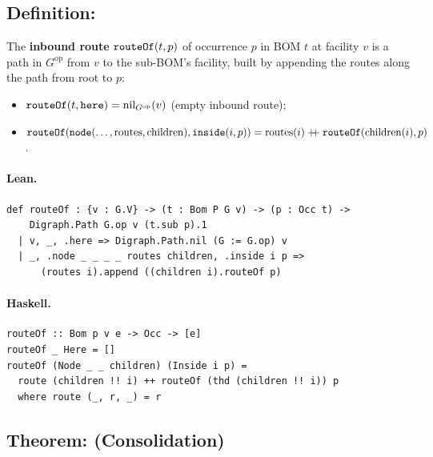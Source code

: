 \documentclass[11pt,a4paper]{article}
\begin{document}
\subsection{Definition: }

\begin{defn}
The \textbf{inbound route} $\texttt{routeOf}(t, p)$ of occurrence $p$ in BOM $t$
at facility $v$ is a path in $G^{\mathrm{op}}$ from $v$ to the sub-BOM's
facility, built by appending the routes along the path from root to $p$:
\begin{itemize}
  \item $\texttt{routeOf}(t, \texttt{here}) = \mathrm{nil}_{G^{\mathrm{op}}}(v)$ (empty inbound route);
  \item $\texttt{routeOf}(\texttt{node}(\ldots, \mathrm{routes}, \mathrm{children}),
    \texttt{inside}(i, p)) = \mathrm{routes}(i) \mathbin{+\!\!+} \texttt{routeOf}(\mathrm{children}(i), p)$.
\end{itemize}
\end{defn}

\paragraph{Lean.}
\begin{lstlisting}[style=lean]
def routeOf : {v : G.V} -> (t : Bom P G v) -> (p : Occ t) ->
    Digraph.Path G.op v (t.sub p).1
  | v, _, .here => Digraph.Path.nil (G := G.op) v
  | _, .node _ _ _ _ routes children, .inside i p =>
      (routes i).append ((children i).routeOf p)
\end{lstlisting}

\paragraph{Haskell.}
\begin{lstlisting}[style=haskell]
routeOf :: Bom p v e -> Occ -> [e]
routeOf _ Here = []
routeOf (Node _ _ children) (Inside i p) =
  route (children !! i) ++ routeOf (thd (children !! i)) p
  where route (_, r, _) = r
\end{lstlisting}


\subsection{Theorem:  (Consolidation)}
\end{document}
